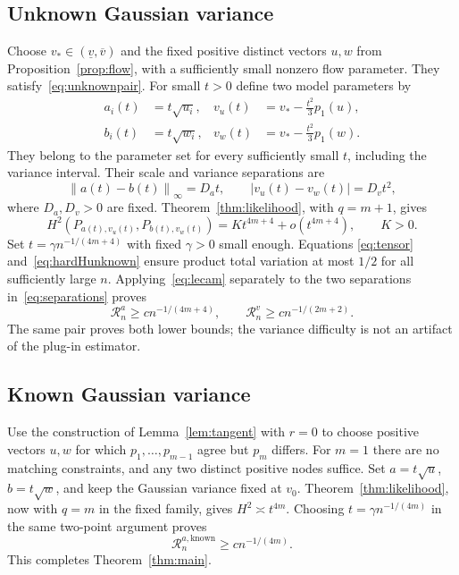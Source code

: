 \documentclass[11pt,a4paper]{article}
\numberwithin{equation}{section}
\theoremstyle{definition}
\theoremstyle{remark}
\newcommand{\norm}[1]{\left\lVert#1\right\rVert}
\newcommand{\risk}{\mathcal R}
\begin{document}
\subsection{Unknown Gaussian variance}
Choose $v_*\in(\underline v,\overline v)$ and the fixed positive distinct
vectors $u,w$ from Proposition~\ref{prop:flow}, with a sufficiently small
nonzero flow parameter. They satisfy~\eqref{eq:unknownpair}. For small $t>0$
define two model parameters by
\begin{align}
 a_i(t)&=t\sqrt{u_i},& v_u(t)&=v_* -\frac{t^2}{3}p_1(u),\\
 b_i(t)&=t\sqrt{w_i},& v_w(t)&=v_* -\frac{t^2}{3}p_1(w).
 \label{eq:hardunknown}
\end{align}
They belong to the parameter set for every sufficiently small $t$, including
the variance interval. Their scale and variance separations are
\begin{equation}
 \norm{a(t)-b(t)}_\infty=D_a t,\qquad
 |v_u(t)-v_w(t)|=D_v t^2,
 \label{eq:separations}
\end{equation}
where $D_a,D_v>0$ are fixed. Theorem~\ref{thm:likelihood}, with $q=m+1$,
gives
\begin{equation}
 H^2(P_{a(t),v_u(t)},P_{b(t),v_w(t)})
 =K t^{4m+4}+o(t^{4m+4}),\qquad K>0.
 \label{eq:hardHunknown}
\end{equation}
Set $t=\gamma n^{-1/(4m+4)}$ with fixed $\gamma>0$ small enough. Equations
\eqref{eq:tensor} and~\eqref{eq:hardHunknown} ensure product total variation
at most $1/2$ for all sufficiently large $n$. Applying~\eqref{eq:lecam}
separately to the two separations in~\eqref{eq:separations} proves
\begin{equation}
 \risk^a_n\ge c n^{-1/(4m+4)},\qquad
 \risk^v_n\ge c n^{-1/(2m+2)}.
\end{equation}
The same pair proves both lower bounds; the variance difficulty is not an
artifact of the plug-in estimator.

\subsection{Known Gaussian variance}
Use the construction of Lemma~\ref{lem:tangent} with $r=0$ to choose positive
vectors $u,w$ for which $p_1,\ldots,p_{m-1}$ agree but $p_m$ differs. For $m=1$
there are no matching constraints, and any two distinct positive nodes
suffice. Set $a=t\sqrt u$, $b=t\sqrt w$, and keep the Gaussian variance
fixed at $v_0$. Theorem~\ref{thm:likelihood}, now with $q=m$ in the fixed
family, gives $H^2\asymp t^{4m}$. Choosing $t=\gamma n^{-1/(4m)}$ in the same
two-point argument proves
\begin{equation}
 \risk^{a,\mathrm{known}}_n\ge c n^{-1/(4m)}.
\end{equation}
This completes Theorem~\ref{thm:main}.
\end{document}
